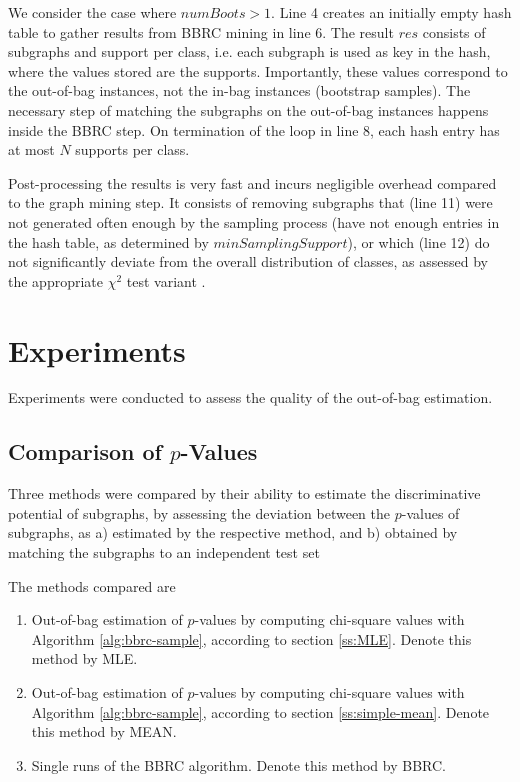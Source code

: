 \documentclass{article}
\begin{document}
We consider the case where $numBoots>1$. Line 4 creates an initially empty hash
table to gather results from BBRC mining in line 6. The result
$res$ consists of subgraphs and support per class, i.e. each
subgraph is used as key in the hash, where the values stored are the
supports. Importantly, these values correspond to the
out-of-bag instances, not the in-bag instances (bootstrap samples). The
necessary step of matching the subgraphs on the out-of-bag instances happens
inside the BBRC step. On termination of the loop in line 8, each hash entry has
at most $N$ supports per class.

Post-processing the results is very fast and incurs negligible overhead
compared to the graph mining step. It consists of removing subgraphs that (line
11) were not generated often enough by the sampling process (have not enough
entries in the hash table, as determined by $minSamplingSupport$), or which
(line 12) do not significantly deviate from the overall distribution of classes,
as assessed by the appropriate $\chi^2$ test variant .


\section{Experiments}
\label{s:Experiments}
Experiments were conducted to assess the quality of the out-of-bag estimation.

\subsection{Comparison of $p$-Values} Three methods were compared by their
ability to estimate the discriminative potential of subgraphs, by assessing the
deviation between the $p$-values of subgraphs, as a) estimated by the
respective method, and b) obtained by matching the subgraphs to an independent
test set

The methods compared are

\begin{enumerate}
  \item{Out-of-bag estimation of $p$-values by computing chi-square values with Algorithm \ref{alg:bbrc-sample}, according to section \ref{ss:MLE}. Denote this method by MLE.}
  \item{Out-of-bag estimation of $p$-values by computing chi-square values with Algorithm \ref{alg:bbrc-sample}, according to section \ref{ss:simple-mean}. Denote this method by MEAN.}
  \item{Single runs of the BBRC algorithm. Denote this method by BBRC.} 
\end{enumerate}
\end{document}
